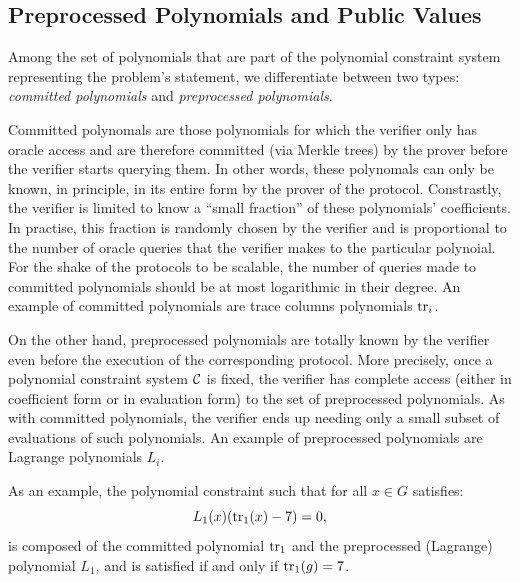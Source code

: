 
\fi



\subsection{Preprocessed Polynomials and Public Values}\label{sec:preprocessed-public}

Among the set of polynomials that are part of the polynomial constraint system representing the problem's statement, we differentiate between two types: \textit{committed polynomials} and \textit{preprocessed polynomials}. 

Committed polynomals are those polynomials for which the verifier only has oracle access and are therefore committed (via Merkle trees) by the prover before the verifier starts querying them. In other words, these polynomals can only be known, in principle, in its entire form by the prover of the protocol. Constrastly, the verifier is limited to know a ``small fraction'' of these polynomials' coefficients. In practise, this fraction is randomly chosen by the verifier and is proportional to the number of oracle queries that the verifier makes to the particular polynoial. For the shake of the protocols to be scalable, the number of queries made to committed polynomials should be at most logarithmic in their degree. An example of committed polynomials are trace columns polynomials $\text{tr}_i$.

On the other hand, preprocessed polynomials are totally known by the verifier even before the execution of the corresponding protocol. More precisely, once a polynomial constraint system $\mathcal{C}$ is fixed, the verifier has complete access (either in coefficient form or in evaluation form) to the set of preprocessed polynomials. As with committed polynomials, the verifier ends up needing only a small subset of evaluations of such polynomials. An example of preprocessed polynomials are Lagrange polynomials $L_i$.

\begin{example}\label{example:pre-public}
  As an example, the polynomial constraint such that for all $x\in G$ satisfies:
  \begin{equation}\label{eq:pre-public}
    L_1(x) (\text{tr}_1(x) - 7) = 0,
  \end{equation}
  is composed of the committed polynomial $\text{tr}_1$ and the preprocessed (Lagrange) polynomial $L_1$, and is satisfied if and only if $\text{tr}_1(g) = 7$.  
\end{example}


